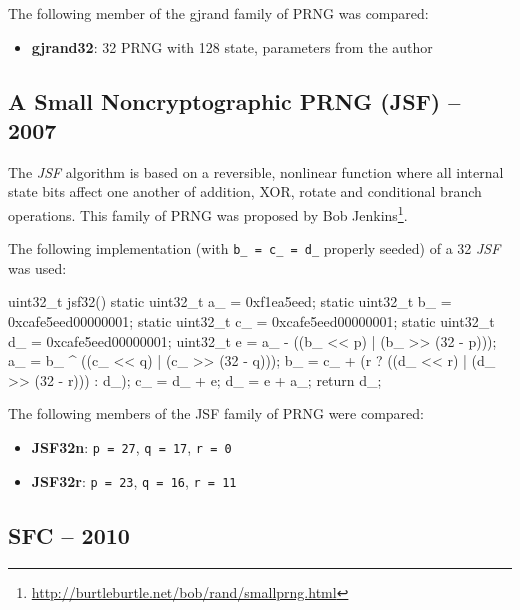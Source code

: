     The following member of the gjrand family of PRNG was compared:
    \begin{itemize}
        \itemsep0em
        \item \textbf{gjrand32}: \SI{32}{\bit} PRNG with \SI{128}{\bit} state, parameters from the author
    \end{itemize}

\subsection[A Small Noncryptographic PRNG (JSF) -- 2007]{A Small Noncryptographic PRNG (JSF) -- 2007} \label{subsec:jsf}

    The \emph{JSF} algorithm is based on a reversible, nonlinear function where all internal state bits affect one another of addition, XOR, rotate and conditional branch operations. This family of PRNG was proposed by Bob Jenkins\footnote[7]{\url{http://burtleburtle.net/bob/rand/smallprng.html}}.

    The following implementation (with \lstinline|b_ = c_ = d_| properly seeded) of a \SI{32}{\bit} \emph{JSF} was used:
\begin{@empty}
    \lstset{
        language = [ISO]C++
    }
\begin{centeredshadowboxlisting}
uint32_t jsf32() {
    static uint32_t a_ = 0xf1ea5eed;
    static uint32_t b_ = 0xcafe5eed00000001;
    static uint32_t c_ = 0xcafe5eed00000001;
    static uint32_t d_ = 0xcafe5eed00000001;
    uint32_t e = a_ - ((b_ << p)
                     | (b_ >> (32 - p)));
    a_ = b_ ^ ((c_ << q) | (c_ >> (32 - q)));
    b_ = c_ + (r ? ((d_ << r)
                  | (d_ >> (32 - r))) : d_);
    c_ = d_ + e;
    d_ = e + a_;
    return d_;
}
\end{centeredshadowboxlisting}
\end{@empty}

    The following members of the JSF family of PRNG were compared:
    \begin{itemize}
        \itemsep0em
        \item \textbf{JSF32n}: \lstinline|p = 27|, \lstinline|q = 17|, \lstinline|r = 0|
        \item \textbf{JSF32r}: \lstinline|p = 23|, \lstinline|q = 16|, \lstinline|r = 11|
    \end{itemize}

\subsection[SFC -- 2010]{SFC -- 2010} \label{subsec:sfc}

